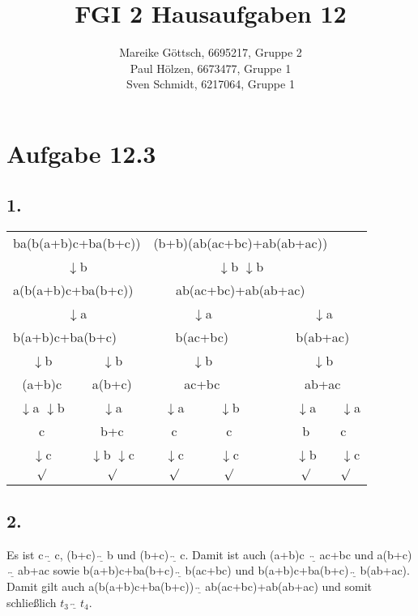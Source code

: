 \documentclass[12pt, paper=a4]{article}
\author{Mareike G\"ottsch, 6695217, Gruppe 2\\Paul H\"olzen, 6673477, Gruppe 1\\Sven Schmidt, 6217064, Gruppe 1}
\title{FGI 2 Hausaufgaben 12}
\begin{document}
\maketitle

\section*{Aufgabe 12.3}
\subsection*{1.}
\begin{center}
\begin{tabular}{ c c | c c c c l }
	\multicolumn{2}{l|}{ba(b(a+b)c+ba(b+c))} &  \multicolumn{4}{c}{(b+b)(ab(ac+bc)+ab(ab+ac))} \\
		\multicolumn{2}{c|}{$\downarrow$b} & \multicolumn{4}{c}{ $\downarrow$b $\downarrow$b}\\
	\multicolumn{2}{l|}{a(b(a+b)c+ba(b+c))} & \multicolumn{4}{c}{ab(ac+bc)+ab(ab+ac)}\\
		\multicolumn{2}{c|}{$\downarrow$a} & \multicolumn{2}{c}{ $\downarrow$a} &&\multicolumn{2}{c}{ $\downarrow$a}\\
	\multicolumn{2}{l|}{b(a+b)c+ba(b+c)} & \multicolumn{2}{c}{b(ac+bc)} && \multicolumn{2}{c}{b(ab+ac)} \\
		$\downarrow$b & $\downarrow$b & \multicolumn{2}{c}{ $\downarrow$b} &&\multicolumn{2}{c}{ $\downarrow$b}\\
	(a+b)c & a(b+c) & \multicolumn{2}{c}{ac+bc} && \multicolumn{2}{c}{ab+ac} \\
		$\downarrow$a $\downarrow$b & $\downarrow$a & $\downarrow$a & $\downarrow$b & & $\downarrow$a & $\downarrow$a\\
	c & b+c & c & c & & b & c\\
		$\downarrow$c & $\downarrow$b $\downarrow$c & $\downarrow$c & $\downarrow$c & & $\downarrow$b & $\downarrow$c\\
	$\surd$ & $\surd$ & $\surd$ & $\surd$ & & $\surd$ & $\surd$\\
\end{tabular}
\end{center}


\subsection*{2.}
Es ist c$\overleftrightarrow{\underline{\quad}}$c, (b+c)$\overleftrightarrow{\underline{\quad}}$b und (b+c)$\overleftrightarrow{\underline{\quad}}$c. Damit ist auch (a+b)c $\overleftrightarrow{\underline{\quad}}$ac+bc und a(b+c)$\overleftrightarrow{\underline{\quad}}$ab+ac sowie b(a+b)c+ba(b+c)$\overleftrightarrow{\underline{\quad}}$b(ac+bc) und b(a+b)c+ba(b+c)$\overleftrightarrow{\underline{\quad}}$b(ab+ac). Damit gilt auch a(b(a+b)c+ba(b+c))$\overleftrightarrow{\underline{\quad}}$ab(ac+bc)+ab(ab+ac) und somit schlie{\ss}lich $t_3\overleftrightarrow{\underline{\quad}}t_4$.
\end{document}
